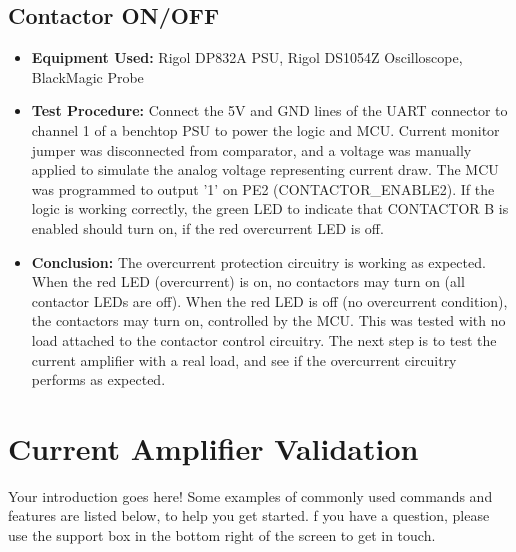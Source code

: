   \subsection{Contactor ON/OFF}
  \begin{itemize}
          \item \textbf{Equipment Used:} Rigol DP832A PSU, Rigol DS1054Z Oscilloscope, BlackMagic Probe
          \item \textbf{Test Procedure:} Connect the 5V and GND lines of the UART connector to channel 1 of a benchtop PSU to power the logic and MCU. 
            Current monitor jumper was disconnected from comparator, and a voltage was manually applied to simulate the analog voltage representing current draw.
            The MCU was programmed to output '1' on PE2 (CONTACTOR\_ENABLE2).
            If the logic is working correctly, the green LED to indicate that CONTACTOR B is enabled should turn on, if the red overcurrent LED is off.
          \item \textbf{Conclusion:} The overcurrent protection circuitry is working as expected.
            When the red LED (overcurrent) is on, no contactors may turn on (all contactor LEDs are off).
            When the red LED is off (no overcurrent condition), the contactors may turn on, controlled by the MCU.
            This was tested with no load attached to the contactor control circuitry.
            The next step is to test the current amplifier with a real load, and see if the overcurrent circuitry performs as expected. 
  \end{itemize}

  \section{Current Amplifier Validation}
  Your introduction goes here! Some examples of commonly used commands and features are listed below, to help you get started.
  f you have a question, please use the support box in the bottom right of the screen to get in touch. 
  
  
  
  
  \begin{versionhistory}
  \end{versionhistory}


